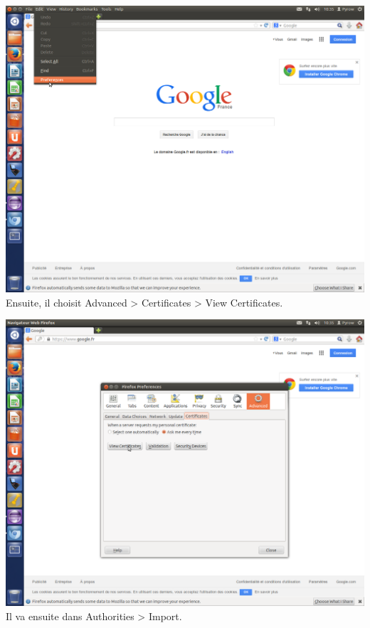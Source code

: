 \includegraphics[width=\textwidth]{images_autorites/OngletPref.png}
\newpage
Ensuite, il choisit Advanced > Certificates > View Certificates.

\includegraphics[width=\textwidth]{images_autorites/OngletCert.png}
\newpage
Il va ensuite dans Authorities > Import.

